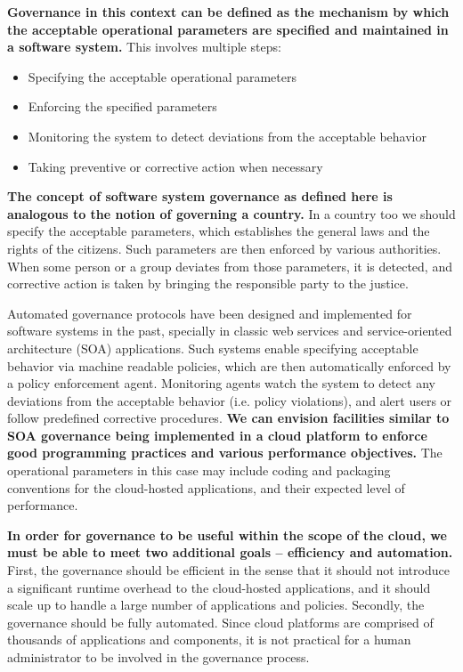 \textbf{Governance in this context can be defined as the mechanism by which the acceptable 
operational parameters are specified and maintained in a software system.} This involves 
multiple steps:
\begin{itemize}
\item Specifying the acceptable operational parameters
\item Enforcing the specified parameters
\item Monitoring the system to detect deviations from the acceptable behavior
\item Taking preventive or corrective action when necessary
\end{itemize}

\textbf{The concept of software system governance as defined here is analogous to the
notion of governing a country.} In a country too we should specify the acceptable
parameters, which establishes the general laws and the rights of the citizens. Such 
parameters are then
enforced by various authorities. When some person or a group deviates from those parameters,
it is detected, and corrective action is taken by bringing the responsible party to the justice.

Automated governance protocols have been designed and implemented for software systems in
the past, specially in classic web services and service-oriented architecture (SOA) applications. 
Such systems enable specifying
acceptable behavior via machine readable policies, which are then automatically enforced by
a policy enforcement agent. Monitoring agents watch the system to detect any deviations from
the acceptable behavior (i.e. policy violations), and alert users or follow predefined corrective
procedures. \textbf{We can envision facilities similar to SOA governance being implemented in a cloud platform to 
enforce good programming practices and various performance objectives.} The operational
parameters in this case may include coding and packaging conventions for the cloud-hosted
applications, and their expected level of performance.

\textbf{In order for governance to be
useful within the scope of the cloud, we must be able to meet two additional
goals -- efficiency and automation.} First, the governance should be 
efficient in the sense that it should not introduce
a significant runtime overhead to the cloud-hosted applications, and it should scale up to
handle a large number of applications and policies. Secondly, the governance should be
fully automated. Since cloud platforms are comprised of thousands of applications and components,
it is not practical for a human administrator to be involved in the governance process.


